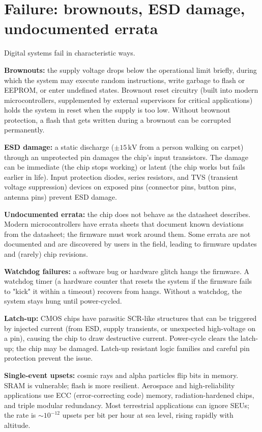 \section{Failure: brownouts, ESD damage, undocumented errata}

Digital systems fail in characteristic ways.

\textbf{Brownouts:} the supply voltage drops below the operational limit briefly, during which the system may execute random instructions, write garbage to flash or EEPROM, or enter undefined states. Brownout reset circuitry (built into modern microcontrollers, supplemented by external supervisors for critical applications) holds the system in reset when the supply is too low. Without brownout protection, a flash that gets written during a brownout can be corrupted permanently.

\textbf{ESD damage:} a static discharge ($\pm 15\,\text{kV}$ from a person walking on carpet) through an unprotected pin damages the chip's input transistors. The damage can be immediate (the chip stops working) or latent (the chip works but fails earlier in life). Input protection diodes, series resistors, and TVS (transient voltage suppression) devices on exposed pins (connector pins, button pins, antenna pins) prevent ESD damage.

\textbf{Undocumented errata:} the chip does not behave as the datasheet describes. Modern microcontrollers have errata sheets that document known deviations from the datasheet; the firmware must work around them. Some errata are not documented and are discovered by users in the field, leading to firmware updates and (rarely) chip revisions.

\textbf{Watchdog failures:} a software bug or hardware glitch hangs the firmware. A watchdog timer (a hardware counter that resets the system if the firmware fails to "kick" it within a timeout) recovers from hangs. Without a watchdog, the system stays hung until power-cycled.

\textbf{Latch-up:} CMOS chips have parasitic SCR-like structures that can be triggered by injected current (from ESD, supply transients, or unexpected high-voltage on a pin), causing the chip to draw destructive current. Power-cycle clears the latch-up; the chip may be damaged. Latch-up resistant logic families and careful pin protection prevent the issue.

\textbf{Single-event upsets:} cosmic rays and alpha particles flip bits in memory. SRAM is vulnerable; flash is more resilient. Aerospace and high-reliability applications use ECC (error-correcting code) memory, radiation-hardened chips, and triple modular redundancy. Most terrestrial applications can ignore SEUs; the rate is $\sim 10^{-12}$ upsets per bit per hour at sea level, rising rapidly with altitude.

